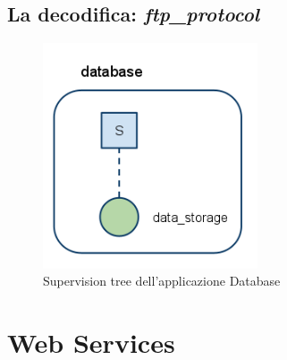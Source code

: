 \subsection{La decodifica: \emph{ftp\_protocol}}

%
\begin{figure}[!h]
\centering
\includegraphics[width=180pt]{img/database.png}
\caption{Supervision tree dell'applicazione Database}
\end{figure}
%
\cite{erl-amnesia}
\section{Web Services}
